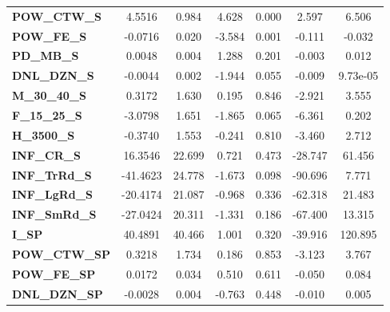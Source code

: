 \begin{center}
\begin{tabular}{lcccccc}
\textbf{POW\_CTW\_S}     &       4.5516  &        0.984     &     4.628  &         0.000        &        2.597    &        6.506     \\
\textbf{POW\_FE\_S}      &      -0.0716  &        0.020     &    -3.584  &         0.001        &       -0.111    &       -0.032     \\
\textbf{PD\_MB\_S}       &       0.0048  &        0.004     &     1.288  &         0.201        &       -0.003    &        0.012     \\
\textbf{DNL\_DZN\_S}     &      -0.0044  &        0.002     &    -1.944  &         0.055        &       -0.009    &     9.73e-05     \\
\textbf{M\_30\_40\_S}    &       0.3172  &        1.630     &     0.195  &         0.846        &       -2.921    &        3.555     \\
\textbf{F\_15\_25\_S}    &      -3.0798  &        1.651     &    -1.865  &         0.065        &       -6.361    &        0.202     \\
\textbf{H\_3500\_S}      &      -0.3740  &        1.553     &    -0.241  &         0.810        &       -3.460    &        2.712     \\
\textbf{INF\_CR\_S}      &      16.3546  &       22.699     &     0.721  &         0.473        &      -28.747    &       61.456     \\
\textbf{INF\_TrRd\_S}    &     -41.4623  &       24.778     &    -1.673  &         0.098        &      -90.696    &        7.771     \\
\textbf{INF\_LgRd\_S}    &     -20.4174  &       21.087     &    -0.968  &         0.336        &      -62.318    &       21.483     \\
\textbf{INF\_SmRd\_S}    &     -27.0424  &       20.311     &    -1.331  &         0.186        &      -67.400    &       13.315     \\
\textbf{I\_SP}           &      40.4891  &       40.466     &     1.001  &         0.320        &      -39.916    &      120.895     \\
\textbf{POW\_CTW\_SP}    &       0.3218  &        1.734     &     0.186  &         0.853        &       -3.123    &        3.767     \\
\textbf{POW\_FE\_SP}     &       0.0172  &        0.034     &     0.510  &         0.611        &       -0.050    &        0.084     \\
\textbf{DNL\_DZN\_SP}    &      -0.0028  &        0.004     &    -0.763  &         0.448        &       -0.010    &        0.005     \\

\end{tabular}
\end{center}
